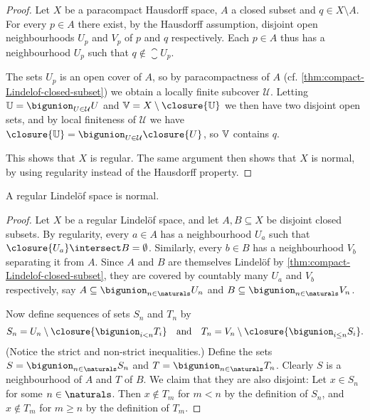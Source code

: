 \documentclass[article, a4paper, 11pt, oneside]{memoir}
\numberwithin{equation}{chapter}
\newcommand{\calU}{\mathcal{U}}
\begin{document}
\begin{proof}
    Let $X$ be a paracompact Hausdorff space, $A$ a closed subset and $q \in X \setminus A$. For every $p \in A$ there exist, by the Hausdorff assumption, disjoint open neighbourhoods $U_p$ and $V_p$ of $p$ and $q$ respectively. Each $p \in A$ thus has a neighbourhood $U_p$ such that $q \not\in \closure{U}_p$.
    
    The sets $U_p$ is an open cover of $A$, so by paracompactness of $A$ (cf. \cref{thm:compact-Lindelof-closed-subset}) we obtain a locally finite subcover $\calU$. Letting $\bbU = \bigunion_{U \in \calU} U$ and $\bbV = X \setminus \closure{\bbU}$ we then have two disjoint open sets, and by local finiteness of $\calU$ we have $\closure{\bbU} = \bigunion_{U \in \calU} \closure{U}$, so $\mathbb{V}$ contains $q$.

    This shows that $X$ is regular. The same argument then shows that $X$ is normal, by using regularity instead of the Hausdorff property.
\end{proof}


\begin{proposition}
    A regular Lindelöf space is normal.
\end{proposition}

\begin{proof}
    Let $X$ be a regular Lindelöf space, and let $A,B \subseteq X$ be disjoint closed subsets. By regularity, every $a \in A$ has a neighbourhood $U_a$ such that $\closure{U_a} \intersect B = \emptyset$. Similarly, every $b \in B$ has a neighbourhood $V_b$ separating it from $A$. Since $A$ and $B$ are themselves Lindelöf by \cref{thm:compact-Lindelof-closed-subset}, they are covered by countably many $U_a$ and $V_b$ respectively, say $A \subseteq \bigunion_{n \in \naturals} U_n$ and $B \subseteq \bigunion_{n \in \naturals} V_n$.

    Now define sequences of sets $S_n$ and $T_n$ by
    \begin{equation*}
        S_n = U_n \setminus \closure{ \bigunion_{i < n} T_i}
        \quad \text{and} \quad
        T_n = V_n \setminus \closure{ \bigunion_{i \leq n} S_i}.
    \end{equation*}
    (Notice the strict and non-strict inequalities.) Define the sets $S = \bigunion_{n \in \naturals} S_n$ and $T = \bigunion_{n \in \naturals} T_n$. Clearly $S$ is a neighbourhood of $A$ and $T$ of $B$. We claim that they are also disjoint: Let $x \in S_n$ for some $n \in \naturals$. Then $x \not\in T_m$ for $m < n$ by the definition of $S_n$, and $x \not\in T_m$ for $m \geq n$ by the definition of $T_m$. 
\end{proof}
\end{document}
